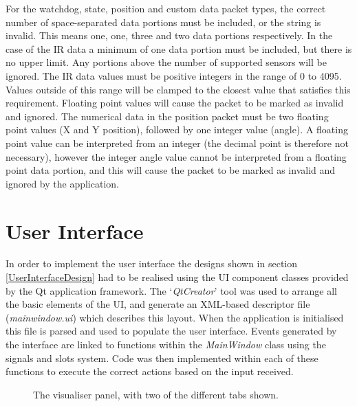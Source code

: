For the watchdog, state, position and custom data packet types, the correct number of space-separated data portions must be included, or the string is invalid. This means one, one, three and two data portions respectively. In the case of the IR data a minimum of one data portion must be included, but there is no upper limit. Any portions above the number of supported sensors will be ignored. The IR data values must be positive integers in the range of 0 to 4095. Values outside of this range will be clamped to the closest value that satisfies this requirement. Floating point values will cause the packet to be marked as invalid and ignored. The numerical data in the position packet must be two floating point values (X and Y position), followed by one integer value (angle). A floating point value can be interpreted from an integer (the decimal point is therefore not necessary), however the integer angle value cannot be interpreted from a floating point data portion, and this will cause the packet to be marked as invalid and ignored by the application. 


\section{User Interface} \label{UserInterfaceImplementation}
In order to implement the user interface the designs shown in section \ref{UserInterfaceDesign} had to be realised using the UI component classes provided by the Qt application framework. The `\textit{QtCreator}' tool was used to arrange all the basic elements of the UI, and generate an XML-based descriptor file (\textit{mainwindow.ui}) which describes this layout. When the application is initialised this file is parsed and used to populate the user interface. Events generated by the interface are linked to functions within the \textit{MainWindow} class using the signals and slots system. Code was then implemented within each of these functions to execute the correct actions based on the input received.

\begin{figure}
 \centering
 \decoRule
 \caption[Visualiser Panel]{The visualiser panel, with two of the different tabs shown.}
 \label{fig:VisualiserPanel}
\end{figure}


